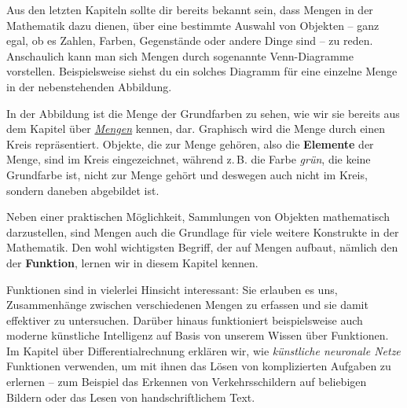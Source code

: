 \documentclass[../../main.tex]{subfiles}
\begin{document}
\label{chap:funktionen}
\label{sec:abbildungen_intuition}
Aus den letzten Kapiteln sollte dir bereits bekannt sein, dass Mengen in der Mathematik dazu dienen, über eine bestimmte Auswahl von Objekten -- ganz egal, ob es Zahlen, Farben, Gegenstände oder andere Dinge sind -- zu reden. Anschaulich kann man sich Mengen durch sogenannte Venn-Diagramme vorstellen. Beispielsweise siehst du ein solches Diagramm für eine einzelne Menge in der nebenstehenden Abbildung.


In der Abbildung ist die Menge der Grundfarben zu sehen, wie wir sie bereits aus dem Kapitel über \href{ch:mengen}{\emph{Mengen}} kennen, dar. Graphisch wird die Menge durch einen Kreis repräsentiert. Objekte, die zur Menge gehören, also die \textbf{Elemente} der Menge, sind im Kreis eingezeichnet, während z.\,B. die Farbe \emph{grün}, die keine Grundfarbe ist, nicht zur Menge gehört und deswegen auch nicht im Kreis, sondern daneben abgebildet ist.

Neben einer praktischen Möglichkeit, Sammlungen von Objekten mathematisch darzustellen, sind Mengen auch die Grundlage für viele weitere Konstrukte in der Mathematik. Den wohl wichtigsten Begriff, der auf Mengen aufbaut, nämlich den der \textbf{Funktion}, lernen wir in diesem Kapitel kennen.

Funktionen sind in vielerlei Hinsicht interessant: Sie erlauben es uns, Zusammenhänge zwischen verschiedenen Mengen zu erfassen und sie damit effektiver zu untersuchen. Darüber hinaus funktioniert beispielsweise auch moderne künstliche Intelligenz auf Basis von unserem Wissen über Funktionen. Im Kapitel über Differentialrechnung erklären wir, wie \emph{künstliche neuronale Netze} Funktionen verwenden, um mit ihnen das Lösen von komplizierten Aufgaben zu erlernen -- zum Beispiel das Erkennen von Verkehrsschildern auf beliebigen Bildern oder das Lesen von handschriftlichem Text.
\end{document}
